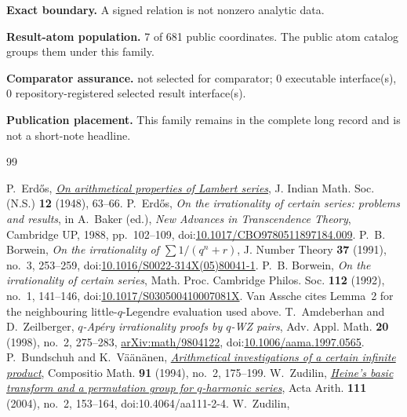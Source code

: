 \documentclass[11pt]{article}
\begin{document}
\textbf{Exact boundary.} A signed relation is not nonzero analytic data.

\textbf{Result-atom population.} 7 of 681 public coordinates. The public atom catalog groups them under this family.

\textbf{Comparator assurance.} not selected for comparator; 0 executable interface(s), 0 repository-registered selected result interface(s).

\textbf{Publication placement.} This family remains in the complete long record and is not a short-note headline.
\begin{thebibliography}{99}
\small
\raggedright
\setlength{\itemsep}{0pt}
 P.~Erd\H{o}s,
  \href{https://users.renyi.hu/~p_erdos/1948-04.pdf}{\emph{On arithmetical
  properties of Lambert series}},
  J. Indian Math. Soc. (N.S.) \textbf{12} (1948), 63--66.
 P.~Erd\H{o}s, \emph{On the irrationality of certain series:
  problems and results}, in A.~Baker (ed.), \emph{New Advances in Transcendence
  Theory}, Cambridge UP, 1988, pp.~102--109,
  doi:\href{https://doi.org/10.1017/CBO9780511897184.009}{10.1017/CBO9780511897184.009}.
 P.~B. Borwein, \emph{On the irrationality of
  $\sum1/(q^{n}+r)$},
  J. Number Theory \textbf{37} (1991), no.~3, 253--259,
  doi:\href{https://doi.org/10.1016/S0022-314X(05)80041-1}{10.1016/S0022-314X(05)80041-1}.
 P.~B. Borwein, \emph{On the irrationality of certain
  series}, Math. Proc. Cambridge Philos. Soc. \textbf{112} (1992), no.~1,
  141--146,
  doi:\href{https://doi.org/10.1017/S030500410007081X}{10.1017/S030500410007081X}.
  Van Assche cites Lemma~2 for the neighbouring little-$q$-Legendre
  evaluation used above.
 T.~Amdeberhan and D.~Zeilberger, \emph{$q$-Ap\'ery
  irrationality proofs by $q$-WZ pairs}, Adv. Appl. Math. \textbf{20} (1998),
  no.~2, 275--283,
  \href{https://arxiv.org/abs/math/9804122}{arXiv:math/9804122},
  doi:\href{https://doi.org/10.1006/aama.1997.0565}{10.1006/aama.1997.0565}.
 P.~Bundschuh and K.~V\"a\"an\"anen,
  \href{https://numdam.org/item/CM_1994__91_2_175_0.pdf}{\emph{Arithmetical
  investigations of a certain infinite product}},
  Compositio Math. \textbf{91} (1994), no.~2, 175--199.
 W.~Zudilin,
  \href{https://geodesic.mathdoc.fr/articles/10.4064/aa111-2-4/}{\emph{Heine's
  basic transform and a permutation group for \(q\)-harmonic series}},
  Acta Arith. \textbf{111} (2004), no.~2, 153--164,
  doi:10.4064/aa111-2-4.
 W.~Zudilin,

\end{thebibliography}
\end{document}
